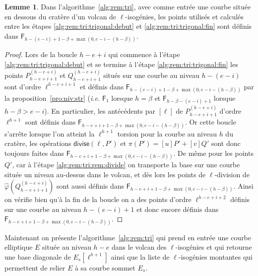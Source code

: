 \documentclass[10pt,a4paper]{book}
\theoremstyle{plain}
\theoremstyle{definition}
\theoremstyle{definition}
\newtheorem{lem}[thm]{Lemme}
\theoremstyle{definition}
\theoremstyle{definition}
\theoremstyle{definition}
\theoremstyle{remark}
\theoremstyle{remark}
\theoremstyle{definition}
\begin{document}
\begin{lem}
\label{lem:alg:rat}
Dans l'algorithme~\ref{alg:rem:tri}, avec comme entrée une courbe située en 
dessous du cratère d'un volcan de $\ell$-isogénies, les points utilisés et 
calculés entre les étapes \ref{alg:rem:tri:trigonal:debut} et 
\ref{alg:rem:tri:trigonal:fin} sont définis dans $\mathsf{F}_{h-(e-i)+1-\beta+
\max(0,e-i-(h-\beta))}$.
\end{lem}

\begin{proof}
Lors de la boucle $h-e+i$ qui commence à l'étape \ref{alg:rem:tri:trigonal:debut} 
et se termine à l'étape \ref{alg:rem:tri:trigonal:fin} les points $P_{h-e+i+1}^{(h-e+i)}$ et 
$Q_{h-e+i+1}^{(h-e+i)}$ situés sur une courbe au niveau $h-(e-i)$ sont d'ordre 
$\ell^{h-e+i+1}$ et définis dans $\mathsf{F}_{h-(e-i)+1-\beta+
\max(0,e-i-(h-\beta))}$ par la proposition~\ref{pro:niv:str} (\emph{i.e.} 
$\mathsf{F}_{1}$ lorsque $h=\beta$ et $\mathsf{F}_{h-\beta-(e-i)+1}$ lorsque 
$h-\beta>e-i$). En particulier, les antécédents par $[\ell]$ de $P_{h-e+i+1}^
{(h-e+i)}$ d'ordre $\ell^{h+1}$ sont définis dans $\mathsf{F}_{h-e+i+1-\beta+
\max(0,e-i-(h-\beta))}$. Or cette boucle s'arrête lorsque l'on atteint la 
$\ell^{h+1}$ torsion pour la courbe au niveau $h$ du cratère, les opérations 
$\mathsf{divise}(\ell, P')$ et $\pi(P')=[u]P'+[v]Q'$ sont donc toujours faites
dans $\mathsf{F}_{h-e+i+1-\beta+\max(0,e-i-(h-\beta))}$. De même pour les 
points $Q'$, car à l'étape \ref{alg:rem:tri:rem:divide} on transporte la base 
sur une courbe située un niveau au-dessus dans le volcan, et dès lors les points
de $\ell$-division de $\widehat{\varphi}(Q_{h-e+i+1}^{(h-e+i)})$ sont aussi 
définis dans $\mathsf{F}_{h-e+i+1-\beta+\max(0,e-i-(h-\beta))}$. Ainsi on 
vérifie bien qu'à la fin de la boucle on a des points d'ordre $\ell^{h-e+i+2}$ 
définis sur une courbe au niveau $h-(e-i)+1$ et donc encore définis dans 
$\mathsf{F}_{h-e+i+1-\beta+\max(0,e-i-(h-\beta))}$.
\end{proof}

Maintenant on présente l'algorithme~\ref{alg:rem:tri} qui prend en entrée une 
courbe elliptique $E$ située au niveau $h-e$ dans le volcan des 
$\ell$-isogénies et qui retourne une base diagonale de $E_s[\ell^{h+1}]$ ainsi 
que la liste de $\ell$-isogénies montantes qui permettent de relier $E$ à sa 
courbe sommet $E_s$.
\end{document}
